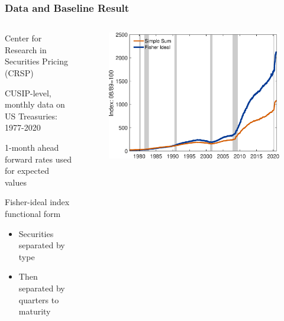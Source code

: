 \documentclass[11pt, handout, aspectratio=169]{beamer}
\newenvironment{wideitemize}{\itemize\addtolength{\itemsep}{10pt}}{\enditemize}
\begin{document}
\begin{frame}
\frametitle{Data and Baseline Result}
\begin{columns}[t]
	\begin{column}{0.45\textwidth}
		\begin{wideitemize}
			\item Center for Research in Securities Pricing (CRSP)
			\item CUSIP-level, monthly data on US Treasuries: 1977-2020
			\item 1-month ahead forward rates used for expected values
			\item Fisher-ideal index functional form 
			\begin{itemize}
				\item Securities separated by type
				\item Then separated by quarters to maturity
			\end{itemize}
		\end{wideitemize}	
	\end{column}
	\hfill
	\begin{column}{0.55\textwidth}
		\begin{figure}[h]
			\centering
			\includegraphics[width=\textwidth]{../Figures/FisherIndex_v2.eps}
		\end{figure}
	\end{column}
\end{columns}
\end{frame}
\end{document}
